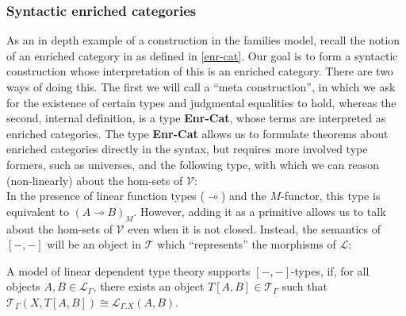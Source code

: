 \subsubsection{Syntactic enriched categories}
As an in depth example of a construction in the families model, recall the notion of an enriched category in as defined in \ref{enr-cat}.
Our goal is to form a syntactic construction whose interpretation of this is an enriched category. There are two ways of doing this. The first we will call a ``meta construction'', in which we ask for the existence of certain types and judgmental equalities to hold, whereas the second, internal definition, is a type \textbf{Enr-Cat}, whose terms are interpreted as enriched categories. The type \textbf{Enr-Cat} allows us to formulate theorems about enriched categories directly in the syntax, but requires more involved type formers, such as universes, and the following type,
with which we can reason (non-linearly) about the hom-sets of $\mathcal{V}$:\\
In the presence of linear function types ($\multimap$) and the $M$-functor, this type is equivalent to $(A \multimap B)_M$. However, adding it as a primitive allows us to talk about the hom-sets of $\mathcal{V}$ even when it is not closed. Instead, the semantics of $[-, -]$ will be an object in $\mathcal{T}$ which ``represents'' the morphisms of $\mathcal{L}$:
\begin{defn}
  A model of linear dependent type theory supports $[-,-]$-types, if, for all objects $A, B \in \mathcal{L}_{\Gamma}$, there exists an object $T[A, B] \in \mathcal{T}_{\Gamma}$ such that $\mathcal{T}_{\Gamma}(X, T[A, B]) \cong \mathcal{L}_{\Gamma.X}(A, B)$.
\end{defn}

